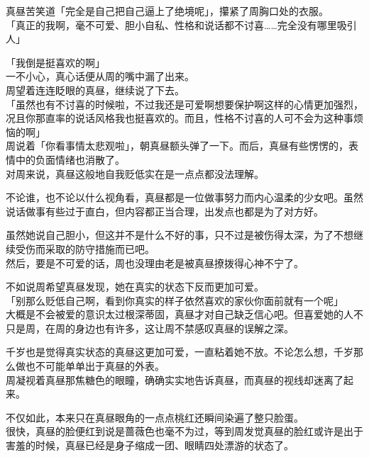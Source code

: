 真昼苦笑道「完全是自己把自己逼上了绝境呢」，攥紧了周胸口处的衣服。\\

「真正的我啊，毫不可爱、胆小自私、性格和说话都不讨喜……完全没有哪里吸引人」

「我倒是挺喜欢的啊」\\

一不小心，真心话便从周的嘴中漏了出来。\\

周望着连连眨眼的真昼，继续说了下去。\\

「虽然也有不讨喜的时候啦，不过我还是可爱啊想要保护啊这样的心情更加强烈，况且你那直率的说话风格我也挺喜欢的。而且，性格不讨喜的人可不会为这种事烦恼的啊」\\

周说着「你看事情太悲观啦」，朝真昼额头弹了一下。而后，真昼有些愣愣的，表情中的负面情绪也消散了。\\

对周来说，真昼这般地自我贬低实在是一点点都没法理解。

不论谁，也不论以什么视角看，真昼都是一位做事努力而内心温柔的少女吧。虽然说话做事有些过于直白，但内容都正当合理，出发点也都是为了对方好。

虽然她说自己胆小，但这并不是什么不好的事，只不过是被伤得太深，为了不想继续受伤而采取的防守措施而已吧。\\

然后，要是不可爱的话，周也没理由老是被真昼撩拨得心神不宁了。

不如说周希望真昼发现，她在真实的状态下反而更加可爱。\\

「别那么贬低自己啊，看到你真实的样子依然喜欢的家伙你面前就有一个呢」\\

大概是不会被爱的意识太过根深蒂固，真昼才对自己缺乏信心吧。但喜爱她的人不只是周，在周的身边也有许多，这让周不禁感叹真昼的误解之深。

千岁也是觉得真实状态的真昼这更加可爱，一直粘着她不放。不论怎么想，千岁那么做也不可能单单出于真昼的外表。\\

周凝视着真昼那焦糖色的眼瞳，确确实实地告诉真昼，而真昼的视线却迷离了起来。

不仅如此，本来只在真昼眼角的一点点桃红还瞬间染遍了整只脸蛋。\\

很快，真昼的脸便红到说是蔷薇色也毫不为过，等到周发觉真昼的脸红或许是出于害羞的时候，真昼已经是身子缩成一团、眼睛四处漂游的状态了。\\


